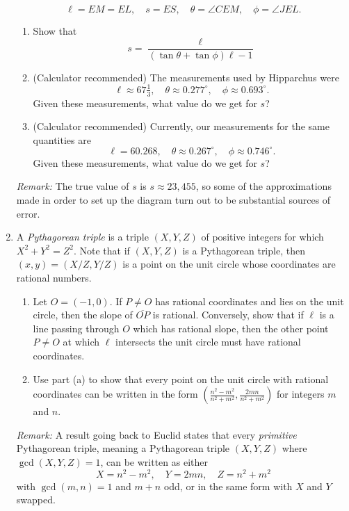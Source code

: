 \begin{enumerate}
\begin{equation*}
\ell = EM = EL,\quad s = ES,\quad\theta = \angle CEM,\quad\phi = \angle JEL.
\end{equation*}
\begin{enumerate}
\item Show that 
\begin{equation*}
s = \frac{\ell}{(\tan\theta + \tan\phi)\ell - 1}
\end{equation*}
\item (Calculator recommended) The measurements used by Hipparchus were
\begin{equation*}
\ell\approx 67\tfrac{1}{3},\quad\theta\approx 0.277^{\circ},\quad\phi\approx 0.693^{\circ}.
\end{equation*}
Given these measurements, what value do we get for $s$?
\item (Calculator recommended) Currently, our measurements for the same quantities are
\begin{equation*}
\ell = 60.268,\quad\theta\approx 0.267^{\circ},\quad\phi\approx 0.746^{\circ}.
\end{equation*}
Given these measurements, what value do we get for $s$?\par
\end{enumerate}
\emph{Remark:} The true value of $s$ is $s\approx 23{,}455$, so some of the approximations made in order to set up the diagram turn out to be substantial sources of error.\newpage
\item A \emph{Pythagorean triple} is a triple $(X,Y,Z)$ of positive integers for which $X^2 + Y^2 = Z^2$. Note that if $(X,Y,Z)$ is a Pythagorean triple, then $(x,y) = (X/Z, Y/Z)$ is a point on the unit circle whose coordinates are rational numbers.
\begin{enumerate}
\item Let $O = (-1,0)$. If $P\neq O$ has rational coordinates and lies on the unit circle, then the slope of $\overline{OP}$ is rational. Conversely, show that if $\ell$ is a line passing through $O$ which has rational slope, then the other point $P\neq O$ at which $\ell$ intersects the unit circle must have rational coordinates.
\item Use part (a) to show that every point on the unit circle with rational coordinates can be written in the form $\displaystyle\left(\frac{n^2 - m^2}{n^2 + m^2}, \frac{2mn}{n^2 + m^2}\right)$ for integers $m$ and $n$.
\end{enumerate}
\emph{Remark:} A result going back to Euclid states that every \emph{primitive} Pythagorean triple, meaning a Pythagorean triple $(X,Y,Z)$ where $\gcd(X,Y,Z) = 1$, can be written as either
\begin{equation*}
X = n^2 - m^2,\quad Y = 2mn,\quad Z = n^2 + m^2
\end{equation*}
with $\gcd(m,n) = 1$ and $m + n$ odd, or in the same form with $X$ and $Y$ swapped.
\end{enumerate}


